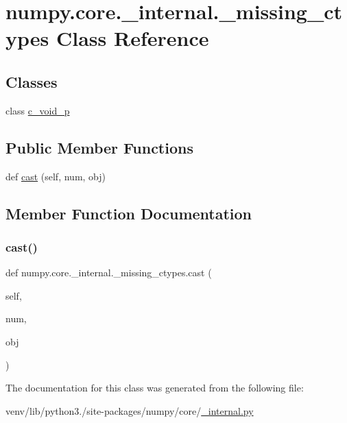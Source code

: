 \hypertarget{classnumpy_1_1core_1_1__internal_1_1__missing__ctypes}{}\section{numpy.\+core.\+\_\+internal.\+\_\+missing\+\_\+ctypes Class Reference}
\label{classnumpy_1_1core_1_1__internal_1_1__missing__ctypes}
\subsection*{Classes}
\begin{DoxyCompactItemize}
\item 
class \hyperlink{classnumpy_1_1core_1_1__internal_1_1__missing__ctypes_1_1c__void__p}{c\+\_\+void\+\_\+p}
\end{DoxyCompactItemize}
\subsection*{Public Member Functions}
\begin{DoxyCompactItemize}
\item 
def \hyperlink{classnumpy_1_1core_1_1__internal_1_1__missing__ctypes_a57c0b738258a2b203f8e3a45763c0ff9}{cast} (self, num, obj)
\end{DoxyCompactItemize}


\subsection{Member Function Documentation}
\mbox{\label{classnumpy_1_1core_1_1__internal_1_1__missing__ctypes_a57c0b738258a2b203f8e3a45763c0ff9}} 
\subsubsection{\texorpdfstring{cast()}{cast()}}
{\footnotesize\ttfamily def numpy.\+core.\+\_\+internal.\+\_\+missing\+\_\+ctypes.\+cast (\begin{DoxyParamCaption}\item[{}]{self,  }\item[{}]{num,  }\item[{}]{obj }\end{DoxyParamCaption})}



The documentation for this class was generated from the following file\+:\begin{DoxyCompactItemize}
\item 
venv/lib/python3./site-\/packages/numpy/core/\hyperlink{__internal_8py}{\+\_\+internal.\+py}\end{DoxyCompactItemize}
